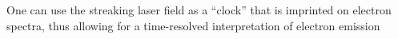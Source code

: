 One can use the streaking laser field as a ``clock'' that is imprinted on electron spectra, thus allowing for a time-resolved interpretation of electron emission \cite{KellerNonadiabatic2013}



